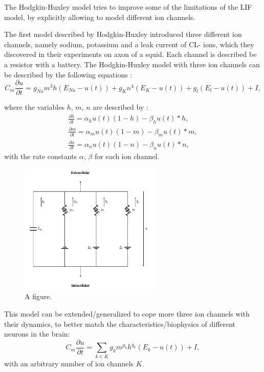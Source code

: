 The Hodgkin-Huxley model tries to improve some of the limitations of the LIF model, by explicitly allowing to model different ion channels. 

The first model described by Hodgkin-Huxley introduced three different ion channels, namely sodium, potassium and a leak current of CL- ions, which they discovered in their experiments on axon of a squid.
Each channel is described be a resistor with a battery.
The Hodgkin-Huxley model with three ion channels can be described by the following equations :
\[
C_m \frac{\partial u}{\partial t} = g_{Na} m^3 h (E_{Na} - u(t)) + g_K n^4 (E_K - u(t)) + g_l (E_l - u(t)) + I,
\]

where the variables $h$, $m$, $n$  are described by :
\[
\begin{split}
	\frac{\partial h}{\partial t} = \alpha_h u(t) (1-h) - \beta_h u(t) * h , \\
	\frac{\partial m}{\partial t} = \alpha_m u(t) (1-m) - \beta_m u(t) * m , \\
	\frac{\partial n}{\partial t} = \alpha_n u(t) (1-n) - \beta_n u(t) * n ,
\end{split}
\]
with the rate constants $\alpha$, $\beta$ for each ion channel.

\begin{figure}
	\centering
    	\includegraphics[width=0.6\textwidth]{imgs/hode_hux.png} 
    \caption{A figure.}
	\label{fig:test}
\end{figure}

This model can be extended/generalized to cope more three ion channels with their dynamics, to better match the characteristics/biophysics of different neurons in the brain:
\[
C_m \frac{\partial u}{\partial t} = \sum_{k \in K} g_k m^{p_k} h^{q_k} (E_k - u(t)) + I,
\]
with an arbitrary number of ion channels $K$.


